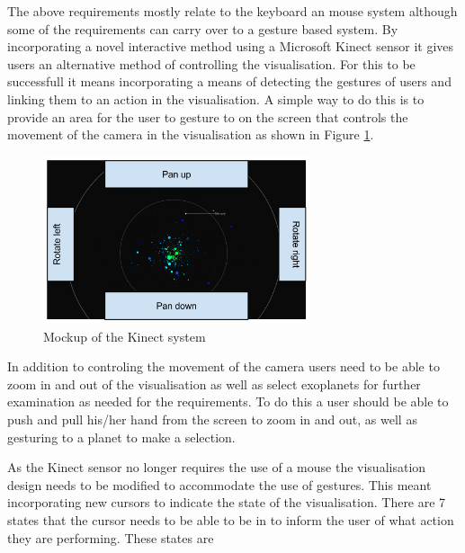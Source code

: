 \begin{enumerate}
The above requirements mostly relate to the keyboard an mouse system although
some of the requirements can carry over to a gesture based system. By
incorporating a novel interactive method using a Microsoft Kinect sensor it
gives users an alternative method of controlling the visualisation. For this to
be successfull it means incorporating a
means of detecting the gestures of users and linking them to an action in the
visualisation. A simple way to do this is to provide an area for the user to
gesture to on the screen that controls the movement of the camera in the
visualisation as shown in Figure \ref{fig:kinectMock}.
\begin{figure}[H]
  \centering
      \includegraphics[width=0.7\textwidth]{images/mockKinect.png}
  \caption{Mockup of the Kinect system}
  \label{fig:kinectMock}
\end{figure}

In addition to controling the movement of the camera users need to be able to
zoom in and out of the visualisation as well as select exoplanets for further
examination as needed for the requirements. To do this a user should be able to
push and pull his/her hand from the screen to zoom in and out, as well as
gesturing to a planet to make a selection.

As the Kinect sensor no longer requires the use of a mouse the visualisation
design needs to be modified to accommodate the use of gestures. This meant
incorporating new cursors to indicate the state of the visualisation.
There are 7 states that the cursor needs to be able to be in to inform the user
of what action they are performing. These states are


\end{enumerate}

